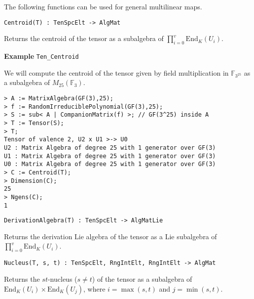 The following functions can be used for general multilinear maps.

\color{blue}
{\small \begin{verbatim}
Centroid(T) : TenSpcElt -> AlgMat
\end{verbatim} }
\color{black}

Returns the centroid of the tensor as a subalgebra of $\prod_{i=0}^v\text{End}_K(U_i)$.

\medskip
\begin{framed} {\bf Example} {\tt Ten\_Centroid}\\
{\small We will compute the centroid of the tensor given by field multiplication in $\mathbb{F}_{3^{25}}$ as a subalgebra of $M_{25}(\mathbb{F}_3)$.
\begin{lstlisting}[frame=single,basicstyle=\ttfamily\color{black!30!
teal},backgroundcolor=\color{white!70!gray}]
> A := MatrixAlgebra(GF(3),25);
> f := RandomIrreduciblePolynomial(GF(3),25);
> S := sub< A | CompanionMatrix(f) >; // GF(3^25) inside A
> T := Tensor(S);
> T;
Tensor of valence 2, U2 x U1 >-> U0
U2 : Matrix Algebra of degree 25 with 1 generator over GF(3)
U1 : Matrix Algebra of degree 25 with 1 generator over GF(3)
U0 : Matrix Algebra of degree 25 with 1 generator over GF(3)
> C := Centroid(T);
> Dimension(C);
25
> Ngens(C);
1
\end{lstlisting} }
\end{framed}

\color{blue}
{\small \begin{verbatim}
DerivationAlgebra(T) : TenSpcElt -> AlgMatLie
\end{verbatim} }
\color{black}

Returns the derivation Lie algebra of the tensor as a Lie subalgebra of $\prod_{i=0}^v\text{End}_K(U_i)$.

\color{blue}
{\small \begin{verbatim}
Nucleus(T, s, t) : TenSpcElt, RngIntElt, RngIntElt -> AlgMat
\end{verbatim} }
\color{black}

Returns the $st$-nucleus ($s\ne t$) of the tensor as a subalgebra of $\text{End}_K(U_i)\times \text{End}_K(U_j)$, 
where $i=\max(s,t)$ and $j=\min(s,t)$.

